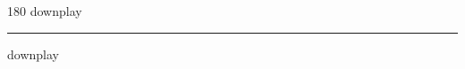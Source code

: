 
\begin{frame}
\begin{center}
\begin{turn}{180}
{\fontsize{2.5cm}{1em}\selectfont downplay}
\end{turn}
\vspace{1em}\par  
\hrule
\vspace{1em}\par  
{\fontsize{2.5cm}{1em}\selectfont downplay}
\end{center}
\end{frame}
